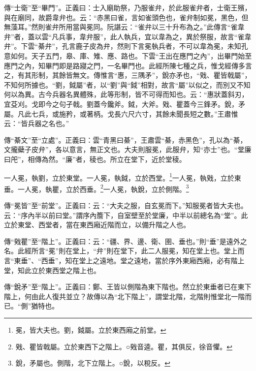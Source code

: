 {\noindent\zhuan{}\fzbyks 傳“士衛”至“畢門”。正義曰：士入廟助祭，乃服雀弁，於此服雀弁者，士衛王殯，與在廟同，故爵韋弁也。云：“赤黑曰雀，言如雀頭色也，雀弁制如冕，黑色，但無藻耳。”然則雀弁所用當與冕同。阮諶云：“雀弁以三十升布為之。”此傳言“雀韋弁”者，蓋以雲“凡兵事，韋弁服”，此人執兵，宜以韋為之，異於祭服，故言“雀韋弁”。下雲“綦弁”，孔言鹿子皮為弁，然則下言冕執兵者，不可以韋為冕，未知孔意如何。天子五門，皋、庫、雉、應、路也。下雲“王出在應門之內”，出畢門始至應門之內，知畢門即是路寢之門，一名畢門也。此經所陳七種之兵，惟戈經傳多言之，有其形制，其餘皆無文。傳惟言“惠，三隅矛”，銳亦矛也，“戣、瞿皆戟屬”，不知何所據也。“劉，鉞屬”者，以“劉”與“鉞”相對，故言“屬”以似之，而別又不知何以為異。古今兵器名異體殊，此等形制，皆不可得而知也。云：“惠狀蓋斜刃，宜芟刈。戈即今之句孑戟。劉蓋今鑱斧。鉞，大斧。戣、瞿蓋今三鋒矛。銳，矛屬。凡此七兵，或施矜，或著柄。戈長六尺六寸，其餘未聞長短之數。”王肅惟云：“皆兵器之名也。” \par}

{\noindent\zhuan{}\fzbyks 傳“綦文”至“立處”。正義曰：雲“青黑曰綦”，王肅雲“綦，赤黑色”，孔以為“綦，文攏蘗子皮弁”，各以意言，無正文也。大夫則服冕，此服弁，知“亦士”也。“堂廉曰戺”，相傳為然。“廉”者，稜也。所立在堂下，近於堂稜。 \par}

一人冕，執劉，立於東堂。一人冕，執鉞，立於西堂。\footnote{冕，皆大夫也。劉，鉞屬。立於東西廂之前堂。}一人冕，執戣，立於東垂。一人冕，執瞿，立於西垂。\footnote{戣、瞿皆戟屬。立於東西下之階上。○戣音逵。瞿，其俱反，徐音懼。}一人冕，執銳，立於側階。\footnote{銳，矛屬也。側階，北下立階上。○銳，以稅反。}

{\noindent\zhuan{}\fzbyks 傳“冕皆”至“前堂”。正義曰：云：“大夫之服，自玄冕而下。”知服冕者皆大夫也。云：“序內半以前曰堂。”謂序內簷下，自室壁至於堂廉，中半以前總名為“堂”。此立於東堂、西堂者，當在東西廂近階而立，以備升階之人也。 \par}

{\noindent\zhuan{}\fzbyks 傳“戣瞿”至“階上”。正義曰：云：“疆、界、邊、衛、圉、垂也。”則“垂”是遠外之名。此經所言“冕”則在堂上，“弁”則在堂下，此二人服冕，知在堂上也。堂上而言“東垂”、“西垂”，知在堂上之遠地。堂之遠地，當於序外東廂西廂，必有階上堂，知此立於東西堂之階上也。 \par}

{\noindent\zhuan{}\fzbyks 傳“銳矛”至“階上”。正義曰：鄭、王皆以側階為東下階也。然立於東垂者已在東下階上，何由此人復共並立？故傳以為“北下階上”，謂堂北階，北階則惟堂北一階而已。“側”猶特也。 \par}

